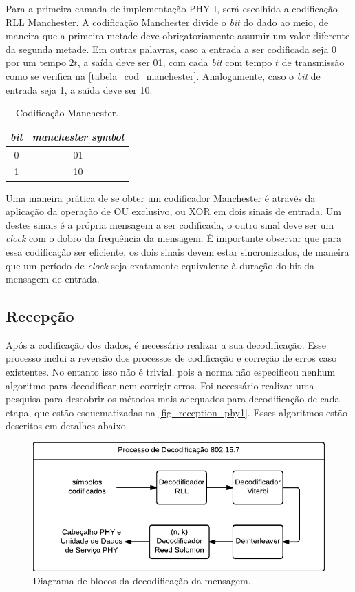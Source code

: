 	Para a primeira camada de implementação PHY I, será escolhida a codificação RLL Manchester. A codificação Manchester divide o \textit{bit} do dado ao meio, de maneira que a primeira metade deve obrigatoriamente assumir um valor diferente da segunda metade. Em outras palavras, caso a entrada a ser codificada seja 0 por um tempo $2t$, a saída deve ser 01, com cada \textit{bit} com tempo $t$ de transmissão como se verifica na \autoref{tabela_cod_manchester}. Analogamente, caso o \textit{bit} de entrada seja 1, a saída deve ser 10.
	\begin{table}[ht]
		\caption{Codificação Manchester.}
		\centering
		\begin{tabular}{c c}
			\hline
			\textit{bit} & \textit{manchester symbol} \\ \hline
			0 & 01 \\
			1 & 10 \\ \hline
		\end{tabular}
		\label{tabela_cod_manchester}
	\end{table}
	Uma maneira prática de se obter um codificador Manchester é através da aplicação da operação de OU exclusivo, ou XOR em dois sinais de entrada. Um destes sinais é a própria mensagem a ser codificada, o outro sinal deve ser um \textit{clock} com o dobro da frequência da mensagem. É importante observar que para essa codificação ser eficiente, os dois sinais devem estar sincronizados, de maneira que um período de \textit{clock} seja exatamente equivalente à duração do bit da mensagem de entrada.	
	
	\subsection{Recepção}\label{section_norma_recepcao}
	
	Após a codificação dos dados, é necessário realizar a sua decodificação. Esse processo inclui a reversão dos processos de codificação e correção de erros caso existentes. No entanto isso não é trivial, pois a norma não especificou nenhum algoritmo para decodificar nem corrigir erros. Foi necessário realizar uma pesquisa para descobrir os métodos mais adequados para decodificação de cada etapa, que estão esquematizadas na \autoref{fig_reception_phy1}. Esses algoritmos estão descritos em detalhes abaixo.

	\begin{figure}[!htb]
		\caption{\label{fig_reception_phy1}Diagrama de blocos da decodificação da mensagem.}
		\centering
		\includegraphics[width=0.4\textheight]{PHY1-reception.pdf}
	\end{figure}
	
